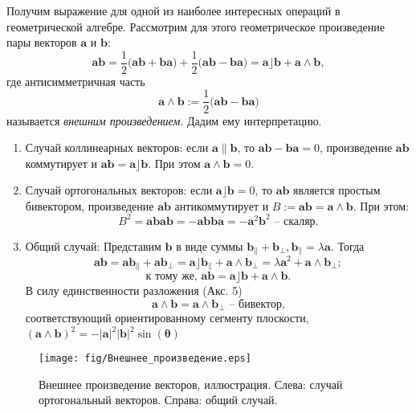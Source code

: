 \documentclass[12pt]{article}
\begin{document}
    Получим выражение для одной из наиболее интересных операций в геометрической алгебре. Рассмотрим для этого геометрическое произведение пары векторов $\mathbf{a}$ и $\mathbf{b}$:
    $$ \mathbf{a}\mathbf{b} = \frac{1}{2}\big(\mathbf{a}\mathbf{b} + \mathbf{b}\mathbf{a}\big) + \frac{1}{2}\big(\mathbf{a}\mathbf{b} - \mathbf{b}\mathbf{a}\big) = \mathbf{a} \rfloor \mathbf{b} + \mathbf{a} \wedge \mathbf{b},$$
    где антисимметричная часть 
    $$\mathbf{a} \wedge \mathbf{b} := \frac{1}{2}\big(\mathbf{a}\mathbf{b} - \mathbf{b}\mathbf{a}\big) $$
    называется \textit{внешним произведением}. Дадим ему интерпретацию.
    \begin{enumerate}
        \item Случай коллинеарных векторов: если $\mathbf{a} \parallel \mathbf{b}$, то $\mathbf{a}\mathbf{b} - \mathbf{b}\mathbf{a} = 0$, произведение $\mathbf{a}\mathbf{b}$ коммутирует и $ \mathbf{a}\mathbf{b} = \mathbf{a} \rfloor \mathbf{b}$. При этом $\mathbf{a} \wedge \mathbf{b} = 0$.
        \item Случай ортогональных векторов: если $\mathbf{a} \rfloor \mathbf{b} = 0$, то $\mathbf{a}\mathbf{b}$ является простым бивектором, произведение $\mathbf{a}\mathbf{b}$ антикоммутирует и $B := \mathbf{a}\mathbf{b} = \mathbf{a} \wedge \mathbf{b}$. При этом:
$$ B^2 = \mathbf{a}\mathbf{b}\mathbf{a}\mathbf{b} = - \mathbf{a}\mathbf{b}\mathbf{b}\mathbf{a} = - \mathbf{a}^2\mathbf{b}^2 \text{ -- скаляр.}$$
        \item Общий случай: Представим $\mathbf{b}$ в виде суммы $\mathbf{b}_{\parallel} + \mathbf{b}_{\bot}, \mathbf{b}_{\parallel} = \lambda \mathbf{a}$. Тогда
    $$\mathbf{a}\mathbf{b}  = \mathbf{a}\mathbf{b}_{\parallel} + \mathbf{a}\mathbf{b}_{\bot}  = \mathbf{a} \rfloor \mathbf{b}_{\parallel} + \mathbf{a} \wedge \mathbf{b}_{\bot} = \lambda \mathbf{a}^2 + \mathbf{a} \wedge \mathbf{b}_{\bot};$$
$$\text{к тому же, } \mathbf{a}\mathbf{b} = \mathbf{a} \rfloor \mathbf{b} + \mathbf{a} \wedge \mathbf{b}.$$
В силу единственности разложения (Акс. 5)
$$\mathbf{a} \wedge \mathbf{b} = \mathbf{a} \wedge \mathbf{b}_{\bot} \text{ -- бивектор,}$$ соответствующий ориентированному сегменту плоскости, $(\mathbf{a} \wedge \mathbf{b})^2 = - |\mathbf{a}|^2|\mathbf{b}|^2\sin(\boldsymbol{\theta})$
    \end{enumerate}

\begin{figure}[h]
    \centering
    \texttt{[image: fig/Внешнее\_произведение.eps]}
    \caption{Внешнее произведение векторов, иллюстрация. Слева: случай ортогональный векторов. Справа: общий случай.}
\end{figure}
\end{document}
